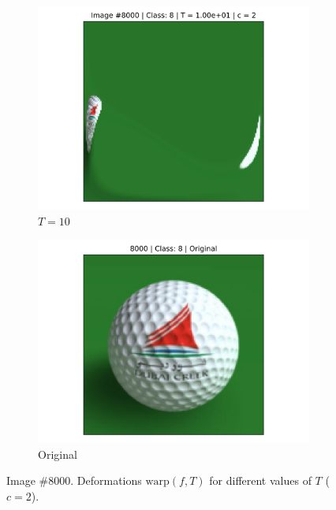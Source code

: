 \begin{figure}[!h]
\begin{subfigure}{0.18\textwidth}
    \includegraphics[width=\textwidth]{ch1-diffy/figures/warping_examples/8000_-1_2.png}
    \caption{$T=10$}
    \end{subfigure}
    \centering
    \begin{subfigure}{0.18\textwidth}
    \includegraphics[width=\textwidth]{ch1-diffy/figures/warping_examples/8000.png}
    \caption{Original}
    \end{subfigure}
    \caption{Image \#8000. Deformations $\text{warp}(f, T)$ for different values of $T$ ($c=2$).}
\end{figure}
